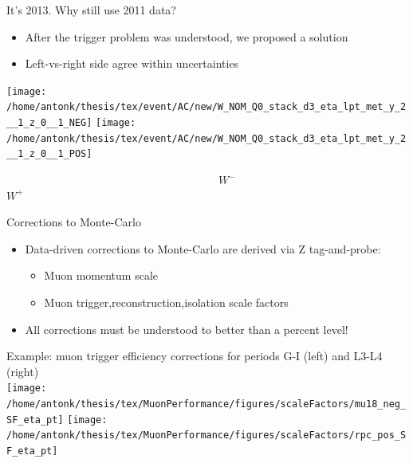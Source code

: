 \begin{frame}{It's 2013. Why still use 2011 data?}
\begin{itemize}
\item After the trigger problem was understood, we proposed a solution
\item Left-vs-right side agree within uncertainties
\end{itemize}

\centering
\texttt{[image: /home/antonk/thesis/tex/event/AC/new/W\_NOM\_Q0\_stack\_d3\_eta\_lpt\_met\_y\_2\_\_1\_z\_0\_\_1\_NEG]}
\texttt{[image: /home/antonk/thesis/tex/event/AC/new/W\_NOM\_Q0\_stack\_d3\_eta\_lpt\_met\_y\_2\_\_1\_z\_0\_\_1\_POS]}

~~~~~~~~~~~~~~~~~~~~~~~~~~~~~~~~~~~~~~$W^-$~~~~~~~~~~~~~~~~~~~~~~~~~~~~$W^+$
\end{frame}

\begin{frame}{Corrections to Monte-Carlo}
\begin{itemize}
\item Data-driven corrections to Monte-Carlo are derived via Z tag-and-probe:
\begin{itemize}
\item Muon momentum scale
\item Muon trigger,reconstruction,isolation scale factors
\end{itemize}
\item All corrections must be understood to better than a percent level!
\end{itemize}

\vspace{.3cm}
\centering
\tiny{Example: muon trigger efficiency corrections for periods G-I (left) and L3-L4 (right) } \\
\texttt{[image: /home/antonk/thesis/tex/MuonPerformance/figures/scaleFactors/mu18\_neg\_SF\_eta\_pt]}
\texttt{[image: /home/antonk/thesis/tex/MuonPerformance/figures/scaleFactors/rpc\_pos\_SF\_eta\_pt]}

\end{frame}


